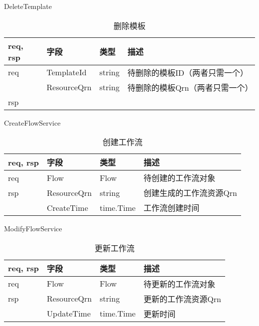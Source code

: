 DeleteTemplate
\begin{table}[H]
    \centering
    \caption{删除模板}
    \label{tab:design-interface-template-delete}
    \begin{tabular}{llll}
        \toprule
        req, rsp   & 字段 & 类型 & 描述 \\
        \midrule
        req & TemplateId & string & 待删除的模板ID（两者只需一个） \\
        & ResourceQrn & string & 待删除的模板Qrn（两者只需一个） \\ \hline
        rsp & & & \\
        \bottomrule
    \end{tabular}
\end{table}

CreateFlowService
\begin{table}[H]
    \centering
    \caption{创建工作流}
    \label{tab:design-interface-flow-create}
    \begin{tabular}{llll}
        \toprule
        req, rsp   & 字段 & 类型 & 描述 \\
        \midrule
        req & Flow & Flow & 待创建的工作流对象 \\ \hline
        rsp & ResourceQrn & string & 创建生成的工作流资源Qrn \\
        & CreateTime & time.Time & 工作流创建时间 \\
        \bottomrule
    \end{tabular}
\end{table}

ModifyFlowService
\begin{table}[H]
    \centering
    \caption{更新工作流}
    \label{tab:design-interface-flow-modify}
    \begin{tabular}{llll}
        \toprule
        req, rsp   & 字段 & 类型 & 描述 \\
        \midrule
        req & Flow & Flow & 待更新的工作流对象 \\ \hline
        rsp & ResourceQrn & string & 更新的工作流资源Qrn \\
        & UpdateTime & time.Time & 更新时间 \\
        \bottomrule
    \end{tabular}
\end{table}


